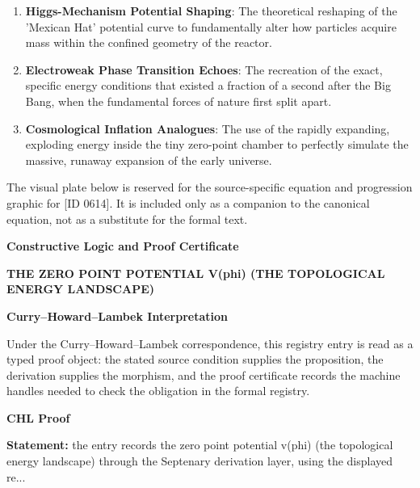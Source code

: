 \begin{enumerate}[leftmargin=1.6em,itemsep=6pt,topsep=4pt]
\item \textbf{Higgs-Mechanism Potential Shaping}: The theoretical reshaping of the 'Mexican Hat' potential curve to fundamentally alter how particles acquire mass within the confined geometry of the reactor.
\item \textbf{Electroweak Phase Transition Echoes}: The recreation of the exact, specific energy conditions that existed a fraction of a second after the Big Bang, when the fundamental forces of nature first split apart.
\item \textbf{Cosmological Inflation Analogues}: The use of the rapidly expanding, exploding energy inside the tiny zero-point chamber to perfectly simulate the massive, runaway expansion of the early universe.
\end{enumerate}

\begingroup\footnotesize\sloppy
The visual plate below is reserved for the source-specific equation and progression graphic for [ID 0614]. It is included only as a companion to the canonical equation, not as a substitute for the formal text.
\par\endgroup
\ifTZPDarkEdition
{}
\fi

\clearpage
\begingroup\tzpsupportsetup
\noindent\textbf{\fontsize{10.8pt}{12.8pt}\selectfont [ID 0614] Constructive Logic and Proof Certificate}\par
\noindent\textbf{\fontsize{10pt}{12pt}\selectfont THE ZERO POINT POTENTIAL V(phi) (THE TOPOLOGICAL ENERGY LANDSCAPE)}\par
\vspace{0.45em}
\begingroup
\footnotesize
\setlength{\parskip}{0.22em}
\setlength{\parindent}{0pt}
\noindent\textbf{Curry--Howard--Lambek Interpretation}\par
Under the Curry--Howard--Lambek correspondence, this registry entry is read as a typed proof
object: the stated source condition supplies the proposition, the derivation supplies the
morphism, and the proof certificate records the machine handles needed to check the obligation
in the formal registry.

\vspace{0.45em}
\noindent\textbf{CHL Proof}\par
\textbf{Statement:} the entry records the zero point potential v(phi) (the topological energy landscape)
through the Septenary derivation layer, using the displayed re...

